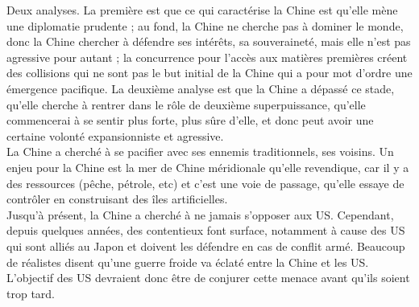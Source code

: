 \documentclass[10pt, a4paper, openany]{book}
\begin{document}
Deux analyses. La première est que ce qui caractérise la Chine est qu'elle mène une diplomatie prudente ; au fond, la Chine ne cherche pas à dominer le monde, donc la Chine chercher à défendre ses intérêts, sa souveraineté, mais elle n'est pas agressive pour autant ; la concurrence pour l'accès aux matières premières créent des collisions qui ne sont pas le but initial de la Chine qui a pour mot d'ordre une émergence pacifique. La deuxième analyse est que la Chine a dépassé ce stade, qu'elle cherche à rentrer dans le rôle de deuxième superpuissance, qu'elle commencerai à se sentir plus forte, plus sûre d'elle, et donc peut avoir une certaine volonté expansionniste et agressive. \\
La Chine a cherché à se pacifier avec ses ennemis traditionnels, ses voisins. Un enjeu pour la Chine est la mer de Chine méridionale qu'elle revendique, car il y a des ressources (pêche, pétrole, etc) et c'est une voie de passage, qu'elle essaye de contrôler en construisant des îles artificielles. \\
Jusqu'à présent, la Chine a cherché à ne jamais s'opposer aux US. Cependant, depuis quelques années, des contentieux font surface, notamment à cause des US qui sont alliés au Japon et doivent les défendre en cas de conflit armé. Beaucoup de réalistes disent qu'une guerre froide va éclaté entre la Chine et les US. L'objectif des US devraient donc être de conjurer cette menace avant qu'ils soient trop tard. 
\end{document}

